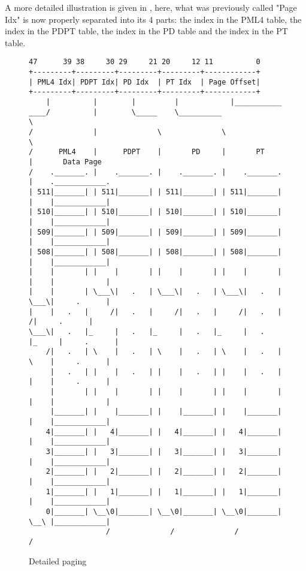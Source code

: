 A more detailed illustration is given in , here, what was previously
called "Page Idx" is now properly separated into its 4 parts: the index in the PML4 table, the index
in the PDPT table, the index in the PD table and the index in the PT table.

\begin{figure}
\begin{verbatim}
47      39 38     30 29     21 20     12 11          0
+---------+---------+---------+---------+------------+
| PML4 Idx| PDPT Idx| PD Idx  | PT Idx  | Page Offset|
+---------+---------+---------+---------+------------+
    |          |        |         |            |___________
____/          |        \_____    \__________              \
/              |              \              \              \
/      PML4    |      PDPT    |       PD     |       PT     |       Data Page
/    ._______. |    ._______. |    ._______. |    ._______. |    .____________.
| 511|_______| | 511|_______| | 511|_______| | 511|_______| |    |____________|
| 510|_______| | 510|_______| | 510|_______| | 510|_______| |    |____________|
| 509|_______| | 509|_______| | 509|_______| | 509|_______| |    |____________|
| 508|_______| | 508|_______| | 508|_______| | 508|_______| |    |____________|
|    |       | |    |       | |    |       | |    |       | |    |            |
|    |       | \___\|   .   | \___\|   .   | \___\|   .   | \___\|     .      |
|    |   .   |     /|   .   |     /|   .   |     /|   .   |     /|     .      |
\___\|   .   |_     |   .   |_     |   .   |_     |   .   |_     |     .      |
    /|   .   | \    |   .   | \    |   .   | \    |   .   | \    |     .      |
     |   .   | |    |   .   | |    |   .   | |    |   .   | |    |     .      |
     |       | |    |       | |    |       | |    |       | |    |            |
     |_______| |    |_______| |    |_______| |    |_______| |    |____________|
    4|_______| |   4|_______| |   4|_______| |   4|_______| |    |____________|
    3|_______| |   3|_______| |   3|_______| |   3|_______| |    |____________|
    2|_______| |   2|_______| |   2|_______| |   2|_______| |    |____________|
    1|_______| |   1|_______| |   1|_______| |   1|_______| |    |____________|
    0|_______| \__\0|_______| \__\0|_______| \__\0|_______| \__\ |____________|
                  /              /              /              /
\end{verbatim}
		\caption{Detailed paging}
	\label{fig:PageTranslation}
\end{figure}

